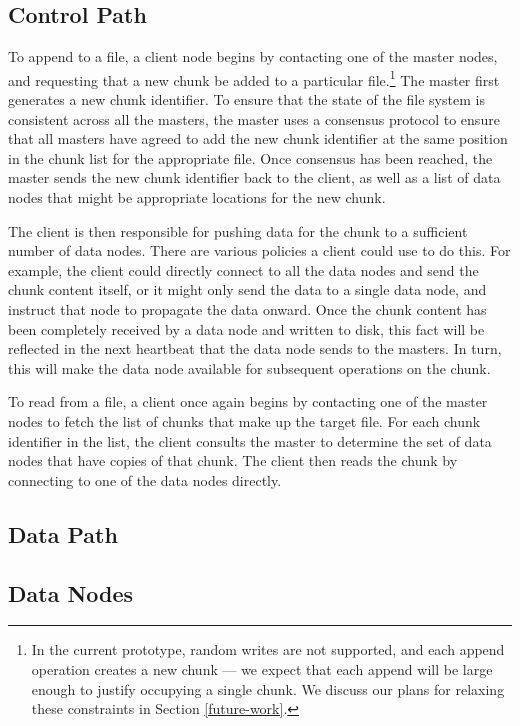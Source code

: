 \documentclass{article}
\begin{document}
\subsection{Control Path}
To append to a file, a client node begins by contacting one of the
master nodes, and requesting that a new chunk be added to a particular
file.\footnote{In the current prototype, random writes are not
  supported, and each append operation creates a new chunk --- we
  expect that each append will be large enough to justify occupying a
  single chunk. We discuss our plans for relaxing these constraints in
  Section \ref{future-work}.} The master first generates a new chunk
identifier. To ensure that the state of the file system is consistent
across all the masters, the master uses a consensus protocol to ensure
that all masters have agreed to add the new chunk identifier at the
same position in the chunk list for the appropriate file. Once
consensus has been reached, the master sends the new chunk identifier
back to the client, as well as a list of data nodes that might be
appropriate locations for the new chunk.

The client is then responsible for pushing data for the chunk to a
sufficient number of data nodes. There are various policies a client
could use to do this. For example, the client could directly connect
to all the data nodes and send the chunk content itself, or it might
only send the data to a single data node, and instruct that node to
propagate the data onward. Once the chunk content has been completely
received by a data node and written to disk, this fact will be
reflected in the next heartbeat that the data node sends to the
masters. In turn, this will make the data node available for
subsequent operations on the chunk.

To read from a file, a client once again begins by contacting one of
the master nodes to fetch the list of chunks that make up the target
file. For each chunk identifier in the list, the client consults the
master to determine the set of data nodes that have copies of that
chunk. The client then reads the chunk by connecting to one of the
data nodes directly.

\subsection{Data Path}

\subsection{Data Nodes}
\end{document}
